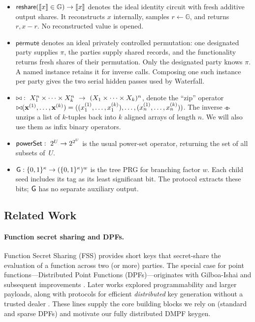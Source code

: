 \begin{itemize}
  \item $\mathsf{reshare}(\share x\in\mathbb G)\to\share x$ denotes the
  ideal identity circuit with fresh additive output shares. It reconstructs
  $x$ internally, samples $r\gets\mathbb G$, and returns $r,x-r$.
  No reconstructed value is opened.

  \item $\mathsf{permute}$ denotes an ideal privately controlled permutation:
  one designated party supplies $\pi$, the parties supply shared records,
  and the functionality returns fresh shares of their permutation.
  Only the designated party knows $\pi$. A named instance retains it for
  inverse calls. Composing one such instance per party gives the two
  serial hidden passes used by Waterfall.

  \item $\mathbin{\triangleright\mspace{-3mu}\triangleleft}:\ X_1^{n}\times \cdots \times X_k^{n}\ \rightarrow\ (X_1\times\cdots\times X_k)^{n}$, denote the ``zip'' operator
  $\mathbin{\triangleright\mspace{-3mu}\triangleleft}(\mathbf{x}^{(1)},\ldots,\mathbf{x}^{(k)})=((x^{(1)}_1,\ldots,x^{(k)}_1),\ldots,(x^{(1)}_n,\ldots,x^{(k)}_n))$.
  The inverse $\mspace{-1mu}\triangleleft \mspace{-3mu} \triangleright$ unzips a list of $k$-tuples back into $k$ aligned arrays of length $n$. We will also use them as infix binary operators. 

  \item $\mathsf{powerSet}:\ 2^{U}\rightarrow 2^{2^{U}}$ is the usual power-set operator, returning the set of all subsets of~$U$.

  \item $\mathsf{G}:\{0,1\}^{\kappa}\to(\{0,1\}^{\kappa})^w$ is the tree PRG
  for branching factor $w$. Each child seed includes its tag as its least
  significant bit. The protocol extracts these bits; $\mathsf{G}$ has no separate
  auxiliary output.
\end{itemize}



\subsection{Related Work}

\paragraph{Function secret sharing and DPFs.}
Function Secret Sharing (FSS) provides short keys that secret-share the evaluation of a function across two (or more) parties. The special case for point functions—Distributed Point Functions (DPFs)—originates with Gilboa-Ishai and subsequent improvements \cite{dpf,dpf2}. Later works explored programmability and larger payloads, along with protocols for efficient \emph{distributed} key generation without a trusted dealer \cite{boyle2022programmable,dpfKeygen}. These lines supply the core building blocks we rely on (standard and sparse DPFs) and motivate our fully distributed DMPF keygen.

